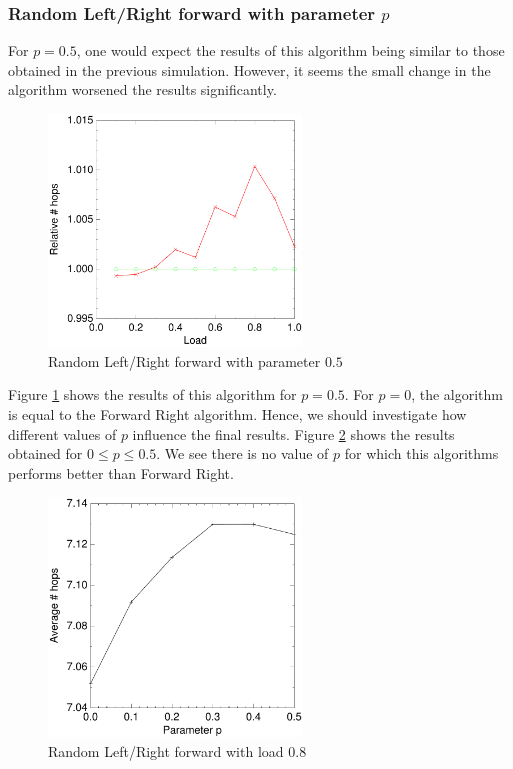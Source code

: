 \documentclass[10pt,a4paper]{article}
\begin{document}
\subsubsection*{Random Left/Right forward with parameter $p$}
For $p=0.5$, one would expect the results of this algorithm being similar to those obtained in the previous simulation. However, it seems the small change in the algorithm worsened the results significantly.

\begin{figure}[h!tb]
\centering
\includegraphics[width=0.6\textwidth]{data/randswitchright.pdf}
\caption{Random Left/Right forward with parameter $0.5$}
\label{figrandswitch}
\end{figure}

Figure \ref{figrandswitch} shows the results of this algorithm for $p=0.5$. For $p=0$, the algorithm is equal to the Forward Right algorithm. Hence, we should investigate how different values of $p$ influence the final results. Figure \ref{figrandswitchp} shows the results obtained for $0 \leq p \leq 0.5$. We see there is no value of $p$ for which this algorithms performs better than Forward Right.

\begin{figure}[h!tb]
\centering
\includegraphics[width=0.6\textwidth]{data/randswitchp.pdf}
\caption{Random Left/Right forward with load $0.8$}
\label{figrandswitchp}
\end{figure}
\end{document}
